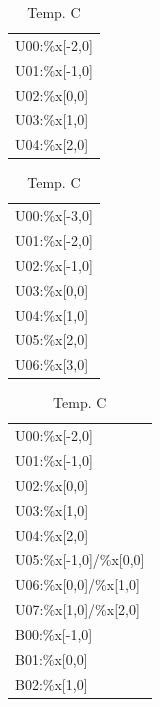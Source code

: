 \documentclass[a4paper,7pt,oneside]{book}
\begin{document}
\begin{table}[!htb]
    \begin{minipage}[b]{.21\linewidth}
      \caption{Temp. A}
      \centering
        \begin{tabular}{|l|}
		\hline
		U00:\%x[-2,0] \hspace{2em} \\
		U01:\%x[-1,0] \\
		U02:\%x[0,0] \\
		U03:\%x[1,0] \\
		U04:\%x[2,0] \\ \hline
		\end{tabular}
    \end{minipage}
    \quad
    \begin{minipage}[b]{.21\linewidth}
      \caption{Temp. B}
      \centering
        \begin{tabular}{|l|}
		\hline
		U00:\%x[-3,0] \hspace{1.9em} \\
		U01:\%x[-2,0] \\
		U02:\%x[-1,0] \\
		U03:\%x[0,0] \\
		U04:\%x[1,0] \\
		U05:\%x[2,0] \\
		U06:\%x[3,0] \\ \hline
		\end{tabular}
    \end{minipage}
    \quad
    \begin{minipage}[b]{.24\linewidth}
      \caption{Temp. C}
      \centering
        \begin{tabular}{|l|}
		\hline
		U00:\%x[-2,0] \hspace{1.9em} \\
		U01:\%x[-1,0] \\
		U02:\%x[0,0] \\
		U03:\%x[1,0] \\
		U04:\%x[2,0] \\
		U05:\%x[-1,0]/\%x[0,0] \\
		U06:\%x[0,0]/\%x[1,0] \\
		U07:\%x[1,0]/\%x[2,0] \\
		B00:\%x[-1,0] \\
		B01:\%x[0,0] \\
		B02:\%x[1,0] \\ \hline
		\end{tabular}
	\end{minipage}
	\quad
    \begin{minipage}[b]{.22\linewidth}

\end{minipage}
\end{table}
\end{document}
